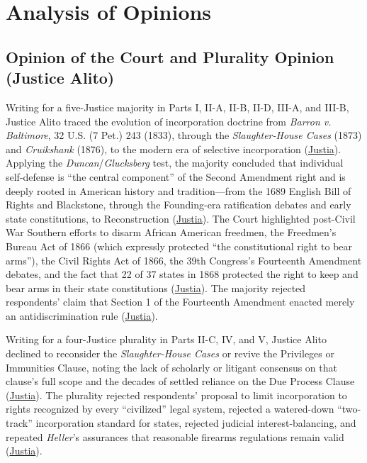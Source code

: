 \documentclass[12pt]{article}
\begin{document}
\section{Analysis of Opinions}

\subsection{Opinion of the Court and Plurality Opinion (Justice Alito)}

Writing for a five-Justice majority in Parts I, II-A, II-B, II-D, III-A, and III-B, Justice Alito traced the evolution of incorporation doctrine from \textit{Barron v. Baltimore}, 32 U.S. (7 Pet.) 243 (1833), through the \textit{Slaughter-House Cases} (1873) and \textit{Cruikshank} (1876), to the modern era of selective incorporation (\href{https://supreme.justia.com/cases/federal/us/561/742/}{Justia}). Applying the \textit{Duncan}/\textit{Glucksberg} test, the majority concluded that individual self-defense is ``the central component'' of the Second Amendment right and is deeply rooted in American history and tradition---from the 1689 English Bill of Rights and Blackstone, through the Founding-era ratification debates and early state constitutions, to Reconstruction (\href{https://supreme.justia.com/cases/federal/us/561/742/}{Justia}). The Court highlighted post-Civil War Southern efforts to disarm African American freedmen, the Freedmen's Bureau Act of 1866 (which expressly protected ``the constitutional right to bear arms''), the Civil Rights Act of 1866, the 39th Congress's Fourteenth Amendment debates, and the fact that 22 of 37 states in 1868 protected the right to keep and bear arms in their state constitutions (\href{https://supreme.justia.com/cases/federal/us/561/742/}{Justia}). The majority rejected respondents' claim that Section 1 of the Fourteenth Amendment enacted merely an antidiscrimination rule (\href{https://supreme.justia.com/cases/federal/us/561/742/}{Justia}).

Writing for a four-Justice plurality in Parts II-C, IV, and V, Justice Alito declined to reconsider the \textit{Slaughter-House Cases} or revive the Privileges or Immunities Clause, noting the lack of scholarly or litigant consensus on that clause's full scope and the decades of settled reliance on the Due Process Clause (\href{https://supreme.justia.com/cases/federal/us/561/742/}{Justia}). The plurality rejected respondents' proposal to limit incorporation to rights recognized by every ``civilized'' legal system, rejected a watered-down ``two-track'' incorporation standard for states, rejected judicial interest-balancing, and repeated \textit{Heller}'s assurances that reasonable firearms regulations remain valid (\href{https://supreme.justia.com/cases/federal/us/561/742/}{Justia}).
\end{document}
